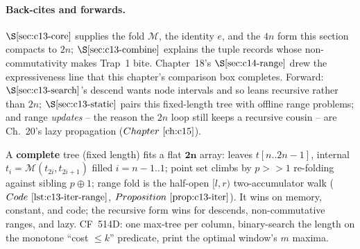 \paragraph{Back-cites and forwards.}
\(\secref{c13-core}\) supplies the fold \(\mathcal{M}\), the identity \(e\), and
the \(4n\) form this section compacts to \(2n\); \(\secref{c13-combine}\) explains
the tuple records whose non-commutativity makes Trap~1 bite.  Chapter~18's
\(\secref{c14-range}\) drew the expressiveness line that this chapter's
comparison box completes.  Forward: \(\secref{c13-search}\)'s descend wants
node intervals and so leans recursive rather than \(2n\); \(\secref{c13-static}\)
pairs this fixed-length tree with offline range problems; and range \emph{updates}
-- the reason the \(2n\) loop still keeps a recursive cousin -- are Ch.~20's lazy
propagation (\(\chref{c15}\)).

\begin{recallbox}
A \textbf{complete} tree (fixed length) fits a flat \(\mathbf{2n}\) array: leaves
\(t[n..2n{-}1]\), internal \(t_i=\mathcal{M}(t_{2i},t_{2i+1})\) filled
\(i{=}n{-}1..\!1\); point set climbs by \(p{>}{>}1\) re-folding against sibling
\(p\oplus1\); range fold is the half-open \([l,r)\) two-accumulator walk
(\(\coderef{c13-iter-range}\), \(\propref{c13-iter}\)).  It wins on memory,
constant, and code; the recursive form wins for descends, non-commutative ranges,
and lazy.  CF~514D: one max-tree per column, binary-search the length on the
monotone ``cost \(\le k\)'' predicate, print the optimal window's \(m\) maxima.
\end{recallbox}
